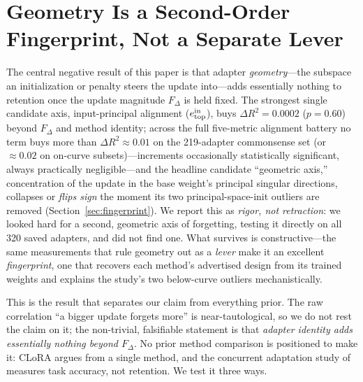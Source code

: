 \documentclass[11pt]{article}
\newcommand{\dw}{F_{\Delta}}
\begin{document}
\section{Geometry Is a Second-Order Fingerprint, Not a Separate Lever}
\label{sec:geometry}\label{sec:ancova}
The central negative result of this paper is that adapter \emph{geometry}---the
subspace an initialization or penalty steers the update into---adds essentially
nothing to retention once the update magnitude $\dw$ is held fixed. The strongest
single candidate axis, input-principal alignment ($e^{\rm in}_{\rm top}$), buys
$\Delta R^2\!=\!0.0002$ ($p\!=\!0.60$) beyond $\dw$ and
method identity; across the full five-metric alignment battery no term buys more
than $\Delta R^2\!\approx\!0.01$ on the 219-adapter commonsense set (or
$\approx\!0.02$ on on-curve subsets)---increments occasionally statistically
significant, always practically negligible---and the headline candidate
``geometric axis,'' concentration of
the update in the base weight's principal singular directions, collapses or
\emph{flips sign}
the moment its two principal-space-init outliers are removed
(Section~\ref{sec:fingerprint}). We report this as \emph{rigor, not retraction}: we
looked hard for a second, geometric axis of forgetting, testing it directly on
all 320 saved adapters, and did not find one. What survives is constructive---the
same measurements that rule geometry out as a \emph{lever} make it an excellent
\emph{fingerprint}, one that recovers each method's advertised design from its
trained weights and explains the study's two below-curve outliers mechanistically.

This is the result that separates our claim from everything prior. The raw
correlation ``a bigger update forgets more'' is near-tautological, so we do not rest
the claim on it; the non-trivial, falsifiable statement is that \emph{adapter
identity adds essentially nothing beyond $\dw$}. No prior method comparison is
positioned to make it: CLoRA argues from a single method, and the concurrent
adaptation study of \citet{lee2026lr} measures task accuracy, not retention. We
test it three ways.
\end{document}
